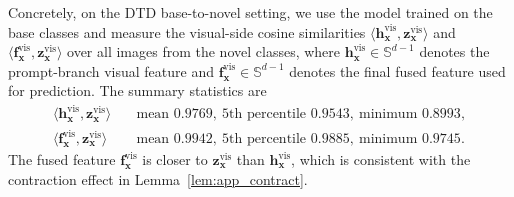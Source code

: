 \documentclass{article}
\theoremstyle{plain}
\theoremstyle{definition}
\theoremstyle{remark}
\begin{document}
	Concretely, on the DTD base-to-novel setting, we use the model trained on the base classes and measure the visual-side cosine similarities $\bigl\langle \mathbf{h}^{\mathrm{vis}}_{\mathbf{x}},\mathbf{z}^{\mathrm{vis}}_{\mathbf{x}}\bigr\rangle$ and $\bigl\langle \mathbf{f}^{\mathrm{vis}}_{\mathbf{x}},\mathbf{z}^{\mathrm{vis}}_{\mathbf{x}}\bigr\rangle$ over all images from the novel classes, where $\mathbf{h}^{\mathrm{vis}}_{\mathbf{x}}\in\mathbb S^{d-1}$ denotes the prompt-branch visual feature and $\mathbf{f}^{\mathrm{vis}}_{\mathbf{x}}\in\mathbb S^{d-1}$ denotes the final fused feature used for prediction.
	The summary statistics are
	\begin{align*}
		\bigl\langle \mathbf{h}^{\mathrm{vis}}_{\mathbf{x}},\mathbf{z}^{\mathrm{vis}}_{\mathbf{x}}\bigr\rangle &\quad \text{mean }0.9769,\ \text{5th percentile }0.9543,\ \text{minimum }0.8993,\\
		\bigl\langle \mathbf{f}^{\mathrm{vis}}_{\mathbf{x}},\mathbf{z}^{\mathrm{vis}}_{\mathbf{x}}\bigr\rangle &\quad \text{mean }0.9942,\ \text{5th percentile }0.9885,\ \text{minimum }0.9745.
	\end{align*}
	The fused feature $\mathbf{f}^{\mathrm{vis}}_{\mathbf{x}}$ is closer to $\mathbf{z}^{\mathrm{vis}}_{\mathbf{x}}$ than $\mathbf{h}^{\mathrm{vis}}_{\mathbf{x}}$, which is consistent with the contraction effect in Lemma~\ref{lem:app_contract}.
	
\end{document}
